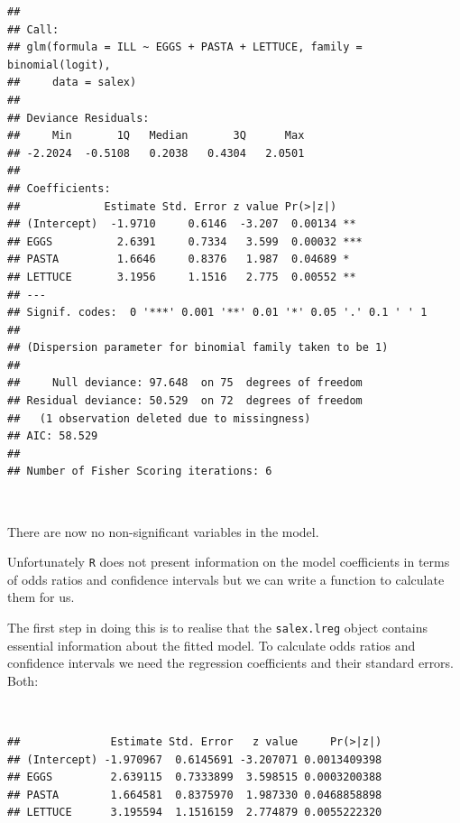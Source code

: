 \documentclass[12pt,a4paper]{book}
\newenvironment{Shaded}{\begin{snugshade}}{\end{snugshade}}
\newcommand{\KeywordTok}[1]{\textcolor[rgb]{0.13,0.29,0.53}{\textbf{#1}}}
\newcommand{\NormalTok}[1]{#1}
\newcommand{\OperatorTok}[1]{\textcolor[rgb]{0.81,0.36,0.00}{\textbf{#1}}}
\theoremstyle{definition}
\theoremstyle{definition}
\theoremstyle{definition}
\theoremstyle{remark}
\begin{document}
\begin{verbatim}
## 
## Call:
## glm(formula = ILL ~ EGGS + PASTA + LETTUCE, family = binomial(logit), 
##     data = salex)
## 
## Deviance Residuals: 
##     Min       1Q   Median       3Q      Max  
## -2.2024  -0.5108   0.2038   0.4304   2.0501  
## 
## Coefficients:
##             Estimate Std. Error z value Pr(>|z|)    
## (Intercept)  -1.9710     0.6146  -3.207  0.00134 ** 
## EGGS          2.6391     0.7334   3.599  0.00032 ***
## PASTA         1.6646     0.8376   1.987  0.04689 *  
## LETTUCE       3.1956     1.1516   2.775  0.00552 ** 
## ---
## Signif. codes:  0 '***' 0.001 '**' 0.01 '*' 0.05 '.' 0.1 ' ' 1
## 
## (Dispersion parameter for binomial family taken to be 1)
## 
##     Null deviance: 97.648  on 75  degrees of freedom
## Residual deviance: 50.529  on 72  degrees of freedom
##   (1 observation deleted due to missingness)
## AIC: 58.529
## 
## Number of Fisher Scoring iterations: 6
\end{verbatim}

~

There are now no non-significant variables in the model.

\newpage

Unfortunately \texttt{R} does not present information on the model
coefficients in terms of odds ratios and confidence intervals but we can
write a function to calculate them for us.

The first step in doing this is to realise that the \texttt{salex.lreg}
object contains essential information about the fitted model. To
calculate odds ratios and confidence intervals we need the regression
coefficients and their standard errors. Both:

~

\begin{Shaded}
\end{Shaded}

\begin{verbatim}
##              Estimate Std. Error   z value     Pr(>|z|)
## (Intercept) -1.970967  0.6145691 -3.207071 0.0013409398
## EGGS         2.639115  0.7333899  3.598515 0.0003200388
## PASTA        1.664581  0.8375970  1.987330 0.0468858898
## LETTUCE      3.195594  1.1516159  2.774879 0.0055222320
\end{verbatim}
\end{document}

